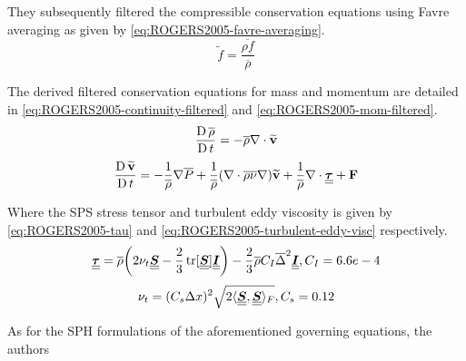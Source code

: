 They subsequently filtered the compressible conservation equations using Favre averaging as given by \ref{eq:ROGERS2005-favre-averaging}.
\begin{equation}
	\widetilde{f} = \frac{\overline{\rho f}}{\overline{\rho}}
	\label{eq:ROGERS2005-favre-averaging}
\end{equation}

The derived filtered conservation equations for mass and momentum are detailed in \ref{eq:ROGERS2005-continuity-filtered} and \ref{eq:ROGERS2005-mom-filtered}.
\begin{equation}
	\frac{\operatorname{D} \overline{\rho}}{\operatorname{D} t} = -\overline{\rho} \nabla \cdot \mathbf{\widetilde{v}}
	\label{eq:ROGERS2005-continuity-filtered}
\end{equation}
\begin{equation}
	\frac{\operatorname{D} \mathbf{\widetilde{v}}}{\operatorname{D} t} = - \frac{1}{\overline{\rho}}\nabla \overline{P} + \frac{1}{\overline{\rho}} (\nabla \cdot \overline{\rho \nu} \nabla) \mathbf{\widetilde{v}} + \frac{1}{\overline{\rho}}\nabla\cdot\underline{\underline{\bm{\tau}}} + \mathbf{F}
	\label{eq:ROGERS2005-mom-filtered}
\end{equation}

Where the SPS stress tensor and turbulent eddy viscosity is given by \ref{eq:ROGERS2005-tau} and \ref{eq:ROGERS2005-turbulent-eddy-visc} respectively.
\begin{equation}
	\underline{\underline{\bm{\tau}}} = \overline{\rho}\bigg(2\nu_t \underline{\underline{\bm{S}}} - \frac{2}{3}\operatorname{tr}[\underline{\underline{\bm{S}}}]\underline{\underline{\bm{I}}}\bigg) - \frac{2}{3}\overline{\rho}C_I \overline{\Delta}^2 \underline{\underline{\bm{I}}}, C_I = 6.6e-4
	\label{eq:ROGERS2005-tau}
\end{equation}
\begin{equation}
	\nu_t = (C_s \Delta x)^2 \sqrt{2 \langle \underline{\underline{\bm{S}}}, \underline{\underline{\bm{S}}} \rangle_F}, C_s = 0.12
	\label{eq:ROGERS2005-turbulent-eddy-visc}
\end{equation}

As for the SPH formulations of the aforementioned governing equations, the authors

